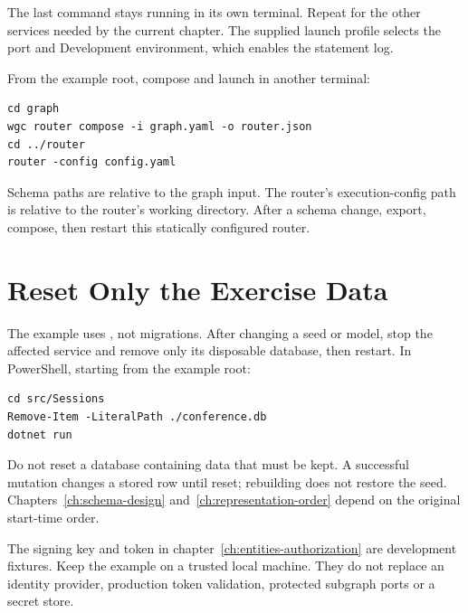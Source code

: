 The last command stays running in its own terminal. Repeat for the other
services needed by the current chapter. The supplied launch profile selects
the port and Development environment, which enables the statement log.

From the example root, compose and launch in another terminal:

\begin{verbatim}
cd graph
wgc router compose -i graph.yaml -o router.json
cd ../router
router -config config.yaml
\end{verbatim}

Schema paths are relative to the graph input. The router's execution-config
path is relative to the router's working directory. After a schema change,
export, compose, then restart this statically configured router.

\section{Reset Only the Exercise Data}

The example uses , not migrations. After changing a seed
or model, stop the affected service and remove only its disposable database,
then restart. In PowerShell, starting from the example root:

\begin{verbatim}
cd src/Sessions
Remove-Item -LiteralPath ./conference.db
dotnet run
\end{verbatim}

Do not reset a database containing data that must be kept. A successful
mutation changes a stored row until reset; rebuilding does not restore the
seed. Chapters~\ref{ch:schema-design} and~\ref{ch:representation-order}
depend on the original start-time order.

The signing key and token in chapter~\ref{ch:entities-authorization} are
development fixtures. Keep the example on a trusted local machine. They do
not replace an identity provider, production token validation, protected
subgraph ports or a secret store.
